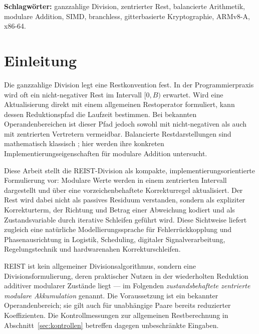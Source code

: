 \documentclass[11pt,a4paper]{scrartcl}
\theoremstyle{definition}
\theoremstyle{plain}
\theoremstyle{remark}
\begin{document}
\begin{list}{}{\setlength{\leftmargin}{2em}\setlength{\rightmargin}{2em}}
\item\relax\small\textbf{Schlagwörter:} ganzzahlige Division, zentrierter Rest, balancierte Arithmetik, modulare Addition, SIMD, branchless, gitterbasierte Kryptographie, ARMv8-A, x86-64.
\end{list}

\newpage
{\small\tableofcontents}
\newpage

\section{Einleitung}
\label{sec:einleitung}

Die ganzzahlige Division legt eine Restkonvention fest. In der
Programmierpraxis wird oft ein nicht-negativer Rest im Intervall $[0,B)$
erwartet. Wird eine Aktualisierung direkt mit einem allgemeinen Restoperator
formuliert, kann dessen Reduktionspfad die Laufzeit bestimmen. Bei bekannten
Operandenbereichen ist dieser Pfad jedoch sowohl mit nicht-negativen als auch
mit zentrierten Vertretern vermeidbar. Balancierte Restdarstellungen sind
mathematisch klassisch \cite{niven,knuth}; hier werden ihre konkreten
Implementierungseigenschaften für modulare Addition untersucht.

Diese Arbeit stellt die REIST-Division als kompakte, implementierungsorientierte Formulierung vor: Modulare Werte werden in einem zentrierten Intervall dargestellt und über eine vorzeichenbehaftete Korrekturregel aktualisiert. Der Rest wird dabei nicht als passives Residuum verstanden, sondern als expliziter Korrekturterm, der Richtung und Betrag einer Abweichung kodiert und als Zustandsvariable durch iterative Schleifen geführt wird. Diese Sichtweise liefert zugleich eine natürliche Modellierungssprache für Fehlerrückkopplung und Phasenausrichtung in Logistik, Scheduling, digitaler Signalverarbeitung, Regelungstechnik und hardwarenahen Korrekturschleifen.

REIST ist kein allgemeiner Divisionsalgorithmus, sondern eine Divisionsformulierung, deren praktischer Nutzen in der wiederholten Reduktion additiver modularer Zustände liegt --- im Folgenden \emph{zustandsbehaftete zentrierte modulare Akkumulation} genannt. Die Voraussetzung ist ein bekannter Operandenbereich; sie gilt auch für unabhängige Paare bereits reduzierter Koeffizienten. Die Kontrollmessungen zur allgemeinen Restberechnung in Abschnitt~\ref{sec:kontrollen} betreffen dagegen unbeschränkte Eingaben.
\end{document}
